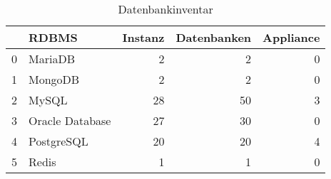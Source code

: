 \begin{table}[H]


\begin{tabular}{llrrr}
\toprule
 & RDBMS & Instanz & Datenbanken & Appliance \\
\midrule
0 & MariaDB & 2 & 2 & 0 \\
1 & MongoDB & 2 & 2 & 0 \\
2 & MySQL & 28 & 50 & 3 \\
3 & Oracle Database & 27 & 30 & 0 \\
4 & PostgreSQL & 20 & 20 & 4 \\
5 & Redis & 1 & 1 & 0 \\
\bottomrule
\end{tabular}
\caption{Datenbankinventar} \label{db_inventory_per_rdbms}
\end{table}

